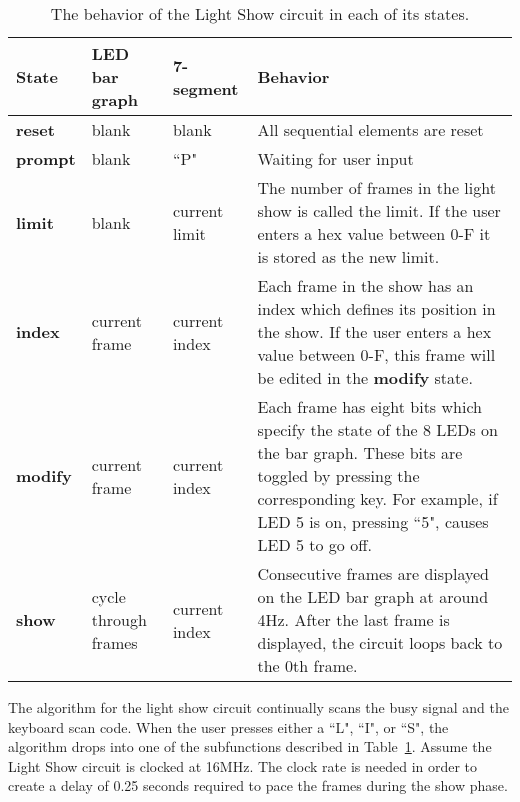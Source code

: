 \begin{description}
        \begin{table}
            \begin{tabular}{l|p{0.5in}|p{0.5in}|p{2.0in}}
                \textbf{ State }    & LED bar graph    & 7-segment    & Behavior                 \\ \hline \hline
                \textbf{ reset }    & blank        & blank        & All sequential elements are reset     \\ \hline
                \textbf{ prompt }    & blank        & ``P"        & Waiting for user input        \\ \hline
                \textbf{ limit }    & blank        & current limit    & The number of frames in the light show is called
                the limit. If the user enters a hex value between 0-F it is stored as the new limit. \\  \hline
                \textbf{ index }    & current frame    & current index    & Each frame in the show has an
                index which defines
                its position in the show. If the user enters a hex value between 0-F, this frame will
                be edited in the \textbf{ modify } state.                         \\ \hline
                \textbf{ modify }    & current frame    & current index    & Each frame has eight bits which
                specify the state of
                the 8 LEDs on the bar graph.  These bits are toggled by pressing the corresponding
                key. For example, if LED 5 is on, pressing ``5", causes LED 5
                to go off.                                \\ \hline
                \textbf{ show }    & cycle through frames & current index & Consecutive frames are displayed on the
                LED bar graph at around 4Hz. After the last frame is displayed, the circuit loops
                back to the 0th frame.                             \\
            \end{tabular}
            \caption{The behavior of the Light Show circuit in each of its states.}
            \label{table:LSbehavior}
        \end{table}

        The algorithm for the light show circuit continually scans the busy signal
        and the keyboard scan code.  When the user presses either a ``L",
        ``I", or ``S",
        the algorithm drops into one of the subfunctions described in
        Table~\ref{table:LSbehavior}.  Assume the Light Show circuit is
        clocked at 16MHz.  The clock rate is needed in order to create a delay of
        0.25 seconds required to pace the frames during the show phase.


\end{description}
